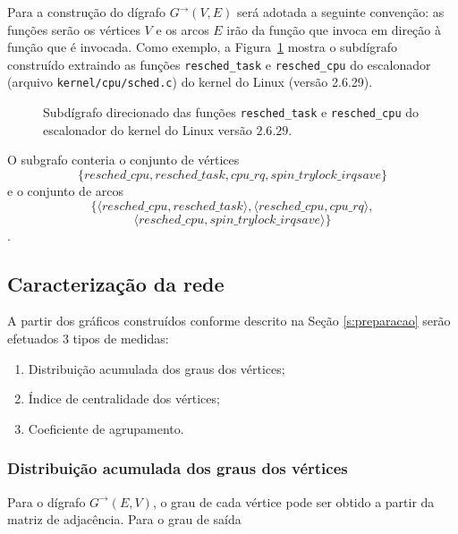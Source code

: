 \documentclass[a4paper,12pt,twoside]{article}
\def\tupla#1{\langle#1\rangle}
\begin{document}
\smallskip

  Para a construção do dígrafo $G^\rightarrow(V,E)$ será adotada a
  seguinte convenção: as funções serão os vértices $V$ e os arcos $E$
  irão da função que invoca em direção à função que é invocada.  Como
  exemplo, a Figura~\ref{fig:function} mostra o subdígrafo construído
  extraindo as funções {\tt resched\_task} e {\tt resched\_cpu} do
  escalonador (arquivo {\tt kernel/cpu/sched.c}) do kernel do Linux
  (versão 2.6.29).

 \begin{figure}[ht]
   \centering
   
   \caption{Subdígrafo direcionado das funções {\tt resched\_task} e
     {\tt resched\_cpu} do escalonador do kernel do Linux versão
      $2.6.29$.}
   \label{fig:function}
 \end{figure}

 O subgrafo conteria o conjunto de vértices $$\{resched\_cpu,
 resched\_task, cpu\_rq, spin\_trylock\_irqsave\}$$ e o conjunto de
 arcos $$\{\tupla{resched\_cpu,resched\_task}, \tupla{resched\_cpu,cpu\_rq},$$
 $$\tupla{resched\_cpu,spin\_trylock\_irqsave}\}$$.
 
\subsection{Caracterização da rede}
\label{s:medidas}

A partir dos gráficos construídos conforme descrito na Seção
\ref{s:preparacao} serão efetuados 3 tipos de medidas:

\def\dist{Distribui\c{c}\~ao acumulada dos graus dos v\'ertices}
\def\centr{Índice de centralidade dos v\'ertices}
\def\group{Coeficiente de agrupamento}

\begin{enumerate}
\item \dist;
\item \centr;
\item \group.
\end{enumerate}

\subsubsection{\dist}
\label{s:distribuicao}

Para o dígrafo $G^{\rightarrow}(E,V)$, o grau de cada vértice pode ser
obtido a partir da matriz de adjacência. Para o grau de saída
\end{document}
